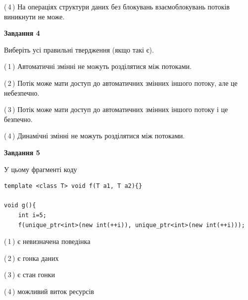 \documentclass[12pt, ukrainian]{article}
\begin{document}
\begin {large}
{(\,4\,) На операціях структури даних без блокувань взаємоблокувань потоків виникнути не може.%



\begin{center}
\textbf{Завдання 4}
\end{center}
Виберіть усі правильні твердження (якщо такі є).\par
\vspace{2mm}

(\,1\,) Автоматичні змінні не можуть розділятися між потоками.%

(\,2\,) Потік може мати доступ до автоматичних змінних іншого потоку, але це небезпечно.%

(\,3\,) Потік може мати доступ до автоматичних змінних іншого потоку і це безпечно.%

(\,4\,) Динамічні змінні не можуть розділятися між потоками.%



\begin{center}
\textbf{Завдання 5}
\end{center}
У цьому фрагменті коду
\begin{verbatim}
template <class T> void f(T a1, T a2){}

void g(){
    int i=5;
    f(unique_ptr<int>(new int(++i)), unique_ptr<int>(new int(++i)));
\end{verbatim}

(\,1\,) є невизначена поведінка%

(\,2\,) є гонка даних%

(\,3\,) є стан гонки%

(\,4\,) можливий виток ресурсів%


}
\end {large}
\end{document}

